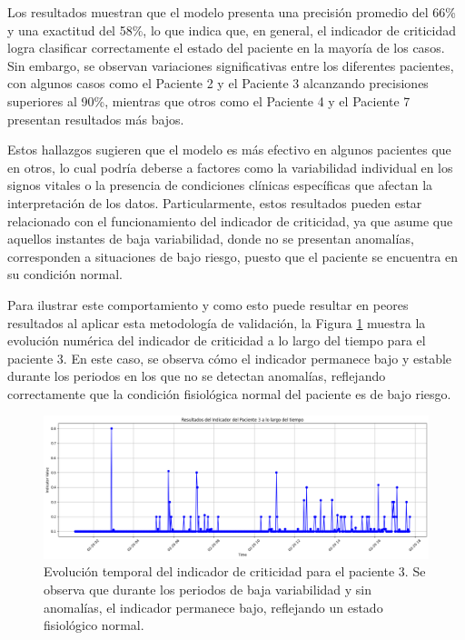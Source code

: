 Los resultados muestran que el modelo presenta una precisión promedio del 66\% y una exactitud del 58\%, lo que indica que, en general, el indicador de criticidad logra clasificar correctamente el estado del paciente en la mayoría de los casos. Sin embargo, se observan variaciones significativas entre los diferentes pacientes, con algunos casos como el Paciente 2 y el Paciente 3 alcanzando precisiones superiores al 90\%, mientras que otros como el Paciente 4 y el Paciente 7 presentan resultados más bajos.

Estos hallazgos sugieren que el modelo es más efectivo en algunos pacientes que en otros, lo cual podría deberse a factores como la variabilidad individual en los signos vitales o la presencia de condiciones clínicas específicas que afectan la interpretación de los datos. Particularmente, estos resultados pueden estar relacionado con el funcionamiento del indicador de criticidad, ya que asume que aquellos instantes de baja variabilidad, donde no se presentan anomalías, corresponden a situaciones de bajo riesgo, puesto que el paciente se encuentra en su condición normal.

Para ilustrar este comportamiento y como esto puede resultar en peores resultados al aplicar esta metodología de validación, la Figura \ref{fig:indicador_tiempo_paciente3} muestra la evolución numérica del indicador de criticidad a lo largo del tiempo para el paciente 3. En este caso, se observa cómo el indicador permanece bajo y estable durante los periodos en los que no se detectan anomalías, reflejando correctamente que la condición fisiológica normal del paciente es de bajo riesgo.

\begin{figure}[ht]
  \centering
  \includegraphics[width=\textwidth]{Images/indicador_de_criticidad_cambio.png}
  \caption{Evolución temporal del indicador de criticidad para el paciente 3. Se observa que durante los periodos de baja variabilidad y sin anomalías, el indicador permanece bajo, reflejando un estado fisiológico normal.}
  \label{fig:indicador_tiempo_paciente3}
\end{figure}

